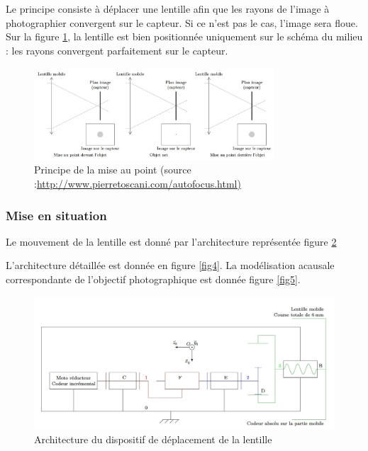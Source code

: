 Le principe consiste à déplacer une lentille afin que les rayons de
l'image à photographier convergent sur le capteur. Si ce n'est pas le
cas, l'image sera floue. Sur la figure \ref{fig2}, la lentille est bien positionnée uniquement sur le schéma du milieu :
les rayons convergent parfaitement sur le capteur.


\begin{figure}[!htb]
\begin{center}
\includegraphics[width=0.8\textwidth]{images/image_fig2.jpg}
\caption{Principe de la mise au point (source :\url{http://www.pierretoscani.com/autofocus.html)} \label{fig2}}
\end{center}
\end{figure}

\FloatBarrier

\subsubsection{Mise en situation}\label{mise-en-situation}


Le mouvement de la lentille est donné par l'architecture représentée
figure \ref{fig3}

L'architecture détaillée est donnée en figure \ref{fig4}. La modélisation acausale
correspondante de l'objectif photographique est donnée figure \ref{fig5}.

\begin{figure}[!htb]
\begin{center}
\includegraphics[width=1.0\textwidth]{images/image_fig3.jpg}
\caption{Architecture du dispositif de déplacement de la lentille \label{fig3}}
\end{center}
\end{figure}

